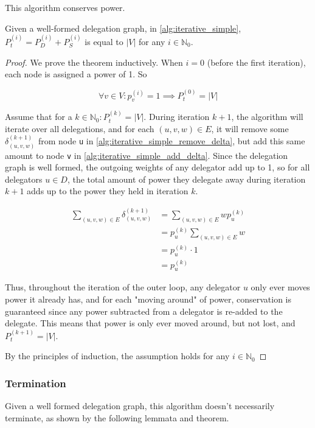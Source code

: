 This algorithm conserves power.

\begin{theorem}
\label{theo:iterative_cons_of_power}
Given a well-formed delegation graph, in \cref{alg:iterative_simple}, $P_t^{(i)} = P_D^{(i)} + P_S^{(i)}$ is equal to $|V|$ for any $i \in \mathbb{N}_0$.
\end{theorem}
\begin{proof}

We prove the theorem inductively. When $i = 0$ (before the first iteration), each node is assigned a power of 1. So 

\[
\forall v \in V: p_v^{(i)} = 1 \implies P_t^{(0)} = |V|
\]

Assume that for a $k \in \mathbb{N}_0: P_t^{(k)} = |V|$. During iteration $k+1$, the algorithm will iterate over all delegations, and for each $(u, v, w) \in E$, it will remove some $\delta_{(u, v, w)}^{(k+1)}$ from node \texttt{u} in \cref{alg:iterative_simple_remove_delta}, but add this same amount to node \texttt{v} in \cref{alg:iterative_simple_add_delta}. Since the delegation graph is well formed, the outgoing weights of any delegator add up to 1, so for all delegators $u \in D$, the total amount of power they delegate away during iteration $k+1$ adds up to the power they held in iteration $k$.

\begin{align*}
\sum_{(u, v, w) \in E} \delta_{(u, v, w)}^{(k+1)} &=  \sum_{(u, v, w) \in E} wp_u^{(k)} \\
&= p_u^{(k)}  \sum_{(u, v, w) \in E} w \\
&= p_u^{(k)} \cdot 1 \\
&= p_u^{(k)}
\end{align*}

Thus, throughout the iteration of the outer loop, any delegator $u$ only ever moves power it already has, and for each "moving around" of power, conservation is guaranteed since any power subtracted from a delegator is re-added to the delegate. This means that power is only ever moved around, but not lost, and $P_t^{(k+1)} = |V|$. 

By the principles of induction, the assumption holds for any $i \in \mathbb{N}_0$
\end{proof}

\subsubsection{Termination}

Given a well formed delegation graph, this algorithm doesn't necessarily terminate, as shown by the following lemmata and theorem.

